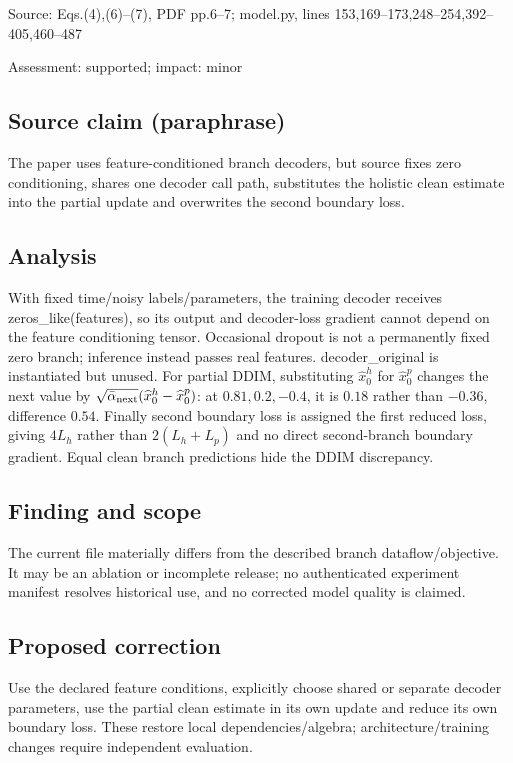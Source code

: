 \documentclass[11pt]{article}
\begin{document}
Source: Eqs.(4),(6)–(7), PDF pp.6–7; model.py, lines 153,169–173,248–254,392–405,460–487

Assessment: supported; impact: minor

\subsection*{Source claim (paraphrase)}

The paper uses feature-conditioned branch decoders, but source fixes zero conditioning, shares one decoder call path, substitutes the holistic clean estimate into the partial update and overwrites the second boundary loss.

\subsection*{Analysis}

With fixed time/noisy labels/parameters, the training decoder receives zeros\_like(features), so its output and decoder-loss gradient cannot depend on the feature conditioning tensor. Occasional dropout is not a permanently fixed zero branch; inference instead passes real features. decoder\_original is instantiated but unused. For partial DDIM, substituting \(\widehat x_0^h\) for \(\widehat x_0^p\) changes the next value by \(\sqrt{\bar\alpha_{\rm next}}(\widehat x_0^h-\widehat x_0^p)\): at \(0.81,0.2,-0.4\), it is \(0.18\) rather than \(-0.36\), difference \(0.54\). Finally second boundary loss is assigned the first reduced loss, giving \(4L_h\) rather than \(2(L_h+L_p)\) and no direct second-branch boundary gradient. Equal clean branch predictions hide the DDIM discrepancy.

\subsection*{Finding and scope}

The current file materially differs from the described branch dataflow/objective. It may be an ablation or incomplete release; no authenticated experiment manifest resolves historical use, and no corrected model quality is claimed.

\subsection*{Proposed correction}

Use the declared feature conditions, explicitly choose shared or separate decoder parameters, use the partial clean estimate in its own update and reduce its own boundary loss. These restore local dependencies/algebra; architecture/training changes require independent evaluation.
\end{document}
